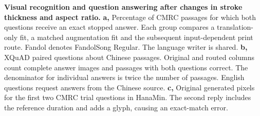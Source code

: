 \textbf{Visual recognition and question answering after changes in stroke thickness and aspect ratio.}
\textbf{a,} Percentage of CMRC passages for which both questions receive an exact stopped answer. Each group compares a translation-only fit, a matched augmentation fit and the subsequent input-dependent print route. Fandol denotes FandolSong Regular. The language writer is shared. \textbf{b,} XQuAD paired questions about Chinese passages. Original and routed columns count complete answer images and passages with both questions correct. The denominator for individual answers is twice the number of passages. English questions request answers from the Chinese source. \textbf{c,} Original generated pixels for the first two CMRC trial questions in HanaMin. The second reply includes the reference duration and adds a glyph, causing an exact-match error.
